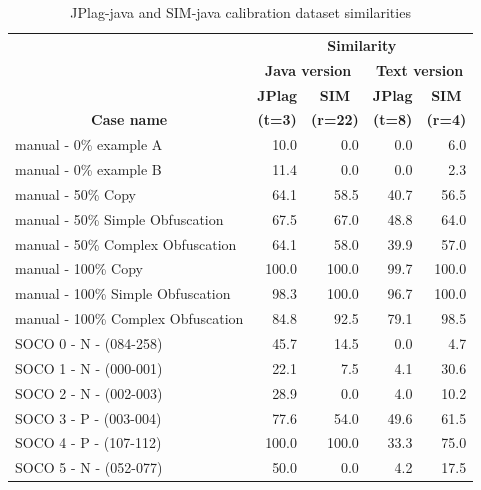 \documentclass[a4paper, 12pt, oneside, openany, final, pdftex]{book}\usepackage[]{graphicx}\usepackage[]{color}
\begin{document}
\begin{table} [bt] 
	\centering 
	\caption{JPlag-java and SIM-java calibration dataset similarities} 
	\label{tbl:simJplagOptimalParamsCalibDataset} 
	\begin{tabular}{l r r | r r} 
		\hiderowcolors 
		\toprule 
		& \multicolumn{4}{c}{\textbf{Similarity}} \\ 
		\cmidrule(l{2pt}r{2pt}){2-5} 
		& \multicolumn{2}{c}{\textbf{Java version}} & \multicolumn{2}{c}{\textbf{Text version}} \\ 
		\cmidrule(l{2pt}r{2pt}){2-3} \cmidrule(l{2pt}r{2pt}){4-5} 
		& \multicolumn{1}{c}{\textbf{JPlag}} &  \multicolumn{1}{c}{\textbf{SIM}} & \multicolumn{1}{c}{\textbf{JPlag}} &  \multicolumn{1}{c}{\textbf{SIM}}  \\ 
		\multicolumn{1}{c}{\textbf{Case name}} & \multicolumn{1}{c}{\textbf{(t=3)}} &  \multicolumn{1}{c}{\textbf{(r=22)}} & \multicolumn{1}{c}{\textbf{(t=8)}} &  \multicolumn{1}{c}{\textbf{(r=4)}}  \\ 
		\showrowcolors 
		\midrule 
		manual - 0\% example A             &  10.0 &   0.0 &   0.0 &   6.0\\  
		manual - 0\% example B             &  11.4 &   0.0 &   0.0 &   2.3\\  
		manual - 50\% Copy               &  64.1 &  58.5 &  40.7 &  56.5\\ 
		manual - 50\% Simple Obfuscation   &  67.5 &  67.0 &  48.8 &  64.0\\ 
		manual - 50\% Complex Obfuscation  &  64.1 &  58.0 &  39.9 &  57.0\\ 
		manual - 100\% Copy                & 100.0 & 100.0 &  99.7 & 100.0\\ 
		manual - 100\% Simple Obfuscation  &  98.3 & 100.0 &  96.7 & 100.0\\ 
		manual - 100\% Complex Obfuscation &  84.8 &  92.5 &  79.1 &  98.5\\ 
		SOCO 0 - N - (084-258)             &  45.7 &  14.5 &   0.0 &   4.7\\ 
		SOCO 1 - N - (000-001)             &  22.1 &   7.5 &   4.1 &  30.6\\ 
		SOCO 2 - N - (002-003)             &  28.9 &   0.0 &   4.0 &  10.2\\ 
		SOCO 3 - P - (003-004)             &  77.6 &  54.0 &  49.6 &  61.5\\ 
		SOCO 4 - P - (107-112)             & 100.0 & 100.0 &  33.3 &  75.0\\ 
		SOCO 5 - N - (052-077)             &  50.0 &   0.0 &   4.2 &  17.5\\ 

\end{tabular}
\end{table}
\end{document}
